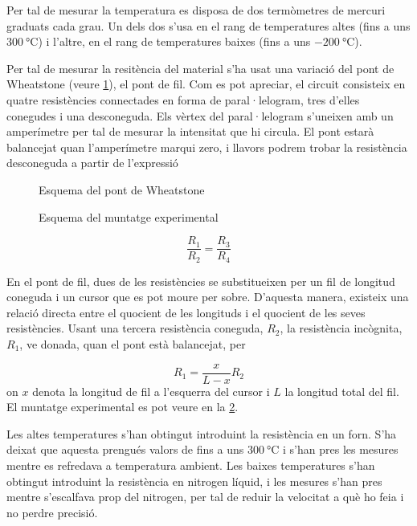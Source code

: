 Per tal de mesurar la temperatura es disposa de dos termòmetres de mercuri graduats cada grau. Un dels dos s'usa en el rang de temperatures altes (fins a uns $\SI{300}{\celsius}$) i l'altre, en el rang de temperatures baixes (fins a uns $ \SI{-200}{\celsius}$).

Per tal de mesurar la resitència del material s'ha usat una variació del pont de Wheatstone (veure \ref{fig: <Wheatstone>}), el pont de fil. Com es pot apreciar, el circuit consisteix en quatre resistències connectades en forma de paral·lelogram, tres d'elles conegudes i una desconeguda. Els vèrtex del paral·lelogram s'uneixen amb un amperímetre per tal de mesurar la intensitat que hi circula. El pont estarà balancejat quan l'amperímetre marqui zero, i llavors podrem trobar la resistència desconeguda a partir de l'expressió
\begin{figure}[h]
	\label{fig: <Wheatstone>}
	\centering
	\caption{Esquema del pont de Wheatstone}
\end{figure}

\begin{figure}[h]
	\label{fig: <muntatge>}
	\centering
	\caption{Esquema del muntatge experimental}
\end{figure}

\begin{equation}
\frac{R_1}{R_2}=\frac{R_3}{R_4}
\end{equation} 

En el pont de fil, dues de les resistències se substitueixen per un fil de longitud coneguda i un cursor que es pot moure per sobre. D'aquesta manera, existeix una relació directa entre el quocient de les longituds i el quocient de les seves resistències. Usant una tercera resistència coneguda, $R_2$, la resistència incògnita, $R_1$, ve donada, quan el pont està balancejat, per

\begin{equation}\label{eq: <pont>}
R_1=\frac{x}{L-x}R_2
\end{equation}
on $x$ denota la longitud de fil a l'esquerra del cursor i $L$ la longitud total del fil. El muntatge experimental es pot veure en la \ref{fig: <muntatge>}. 

Les altes temperatures s'han obtingut introduint la resistència en un forn. S'ha deixat que aquesta prengués valors de fins a uns $\SI{300}{\celsius}$ i s'han pres les mesures mentre es refredava a temperatura ambient. Les baixes temperatures s'han obtingut introduint la resistència en nitrogen líquid, i les mesures s'han pres mentre s'escalfava prop del nitrogen, per tal de reduir la velocitat a què ho feia i no perdre precisió.


